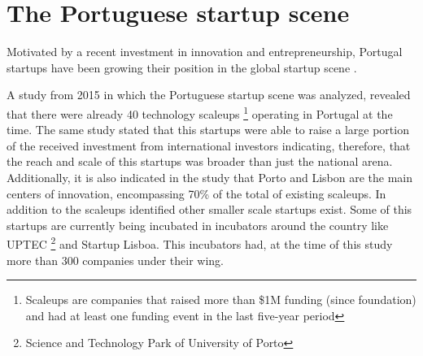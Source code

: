   	\section{The Portuguese startup scene} \label{sec:stateoftheart:sec:portuguesestartupscene}
    Motivated by a recent investment in innovation and entrepreneurship, Portugal startups have been growing their position in the global startup scene \cite{Coleman2015}.

    A study from 2015 \citet{StartupEuropePartnership2015} in which the Portuguese startup scene was analyzed, revealed that there were already 40 technology scaleups \footnote{Scaleups are companies that raised more than \$1M funding (since foundation) and had at least one funding event in the last five-year period } operating in Portugal at the time. The same study stated that this startups were able to raise a large portion of the received investment from international investors indicating, therefore, that the reach and scale of this startups was broader than just the national arena. Additionally, it is also indicated in the study that Porto and Lisbon are the main centers of innovation, encompassing 70\% of the total of existing scaleups. In addition to the scaleups identified other smaller scale startups exist. Some of this startups are currently being incubated in incubators around the country like UPTEC \footnote{Science and Technology Park of University of Porto} and Startup Lisboa. This incubators had, at the time of this study more than 300 companies \cite{Uptec,StartupLisboa} under their wing.


